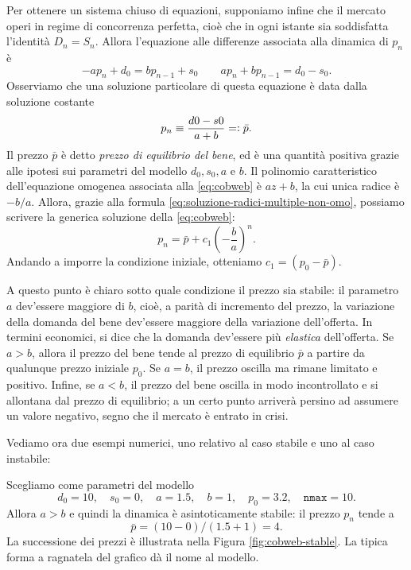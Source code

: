 Per ottenere un sistema chiuso di equazioni, supponiamo infine che
il mercato operi in regime di concorrenza perfetta,
cioè che in ogni istante sia soddisfatta l'identità $D_n = S_n$.
Allora l'equazione alle differenze associata alla dinamica di $p_n$ è
\begin{equation} \label{eq:cobweb}
-a p_n + d_0 = b p_{n-1} + s_0
\qquad
a p_n + b p_{n-1} = d_0 - s_0.
\end{equation}
Osserviamo che una soluzione particolare di questa equazione
è data dalla soluzione costante
\[
p_n \equiv \frac{d0-s0}{a+b} =\vcentcolon \bar{p}.
\]
Il prezzo $\bar{p}$ è detto \emph{prezzo di equilibrio del bene},
ed è una quantità positiva grazie alle ipotesi sui parametri
del modello $d_0,s_0,a$ e $b$.
Il polinomio caratteristico dell'equazione omogenea associata alla
\eqref{eq:cobweb} è $az+b$, la cui unica radice è $-b/a$.
Allora, grazie alla formula \eqref{eq:soluzione-radici-multiple-non-omo},
possiamo scrivere la generica soluzione della \eqref{eq:cobweb}:
\[
p_n = \bar{p} + c_1 \left(-\frac{b}{a}\right)^n.
\]
Andando a imporre la condizione iniziale, otteniamo $c_1 = (p_0-\bar{p})$.

A questo punto è chiaro sotto quale condizione il prezzo sia stabile:
il parametro $a$ dev'essere maggiore di $b$, cioè,
a parità di incremento del prezzo, la variazione della domanda del bene
dev'essere maggiore della variazione dell'offerta.
In termini economici, si dice che la domanda dev'essere più \emph{elastica}
dell'offerta. Se $a > b$, allora il prezzo del bene tende al
prezzo di equilibrio $\bar{p}$ a partire da qualunque prezzo iniziale $p_0$.
Se $a = b$, il prezzo oscilla ma rimane limitato e positivo.
Infine, se $a < b$, il prezzo del bene oscilla in modo incontrollato
e si allontana dal prezzo di equilibrio; a un certo punto arriverà persino
ad assumere un valore negativo, segno che il mercato è entrato in crisi.

Vediamo ora due esempi numerici, uno relativo al caso stabile e uno al caso instabile:

\begin{esem}
Scegliamo come parametri del modello
\[
d_0 = 10, \quad
s_0 = 0, \quad
a = 1.5, \quad
b = 1, \quad
p_0 = 3.2, \quad
\texttt{nmax} = 10.
\]
Allora $a>b$ e quindi la dinamica è asintoticamente stabile: il prezzo $p_n$ tende a
\[
\bar{p} = (10-0)/(1.5+1) = 4.
\]
La successione dei prezzi è illustrata nella Figura \ref{fig:cobweb-stable}.
La tipica forma a ragnatela del grafico dà il nome al modello.
\end{esem}

